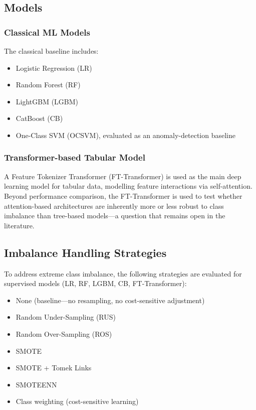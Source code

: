 \subsection{Models}
\label{sec:models}

\subsubsection{Classical ML Models}
The classical baseline includes:
\begin{itemize}
  \item Logistic Regression (LR)
  \item Random Forest (RF)
  \item LightGBM (LGBM)
  \item CatBoost (CB)
  \item One-Class SVM (OCSVM), evaluated as an anomaly-detection baseline
\end{itemize}

\subsubsection{Transformer-based Tabular Model}
A Feature Tokenizer Transformer (FT-Transformer) is used as the main deep learning model for tabular data, modelling feature interactions via self-attention. Beyond performance comparison, the FT-Transformer is used to test whether attention-based architectures are inherently more or less robust to class imbalance than tree-based models---a question that remains open in the literature.

\subsection{Imbalance Handling Strategies}
\label{sec:imbalance_strategies}

To address extreme class imbalance, the following strategies are evaluated for supervised models (LR, RF, LGBM, CB, FT-Transformer):
\begin{itemize}
  \item None (baseline---no resampling, no cost-sensitive adjustment)
  \item Random Under-Sampling (RUS)
  \item Random Over-Sampling (ROS)
  \item SMOTE
  \item SMOTE + Tomek Links
  \item SMOTEENN
  \item Class weighting (cost-sensitive learning)
\end{itemize}

